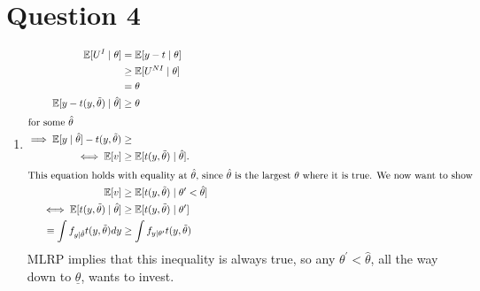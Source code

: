 \section{Question 4}
\begin{enumerate}[label=\alph*)]
\item
  \begin{align*}
    \mathbb{E}[U^I \mid \theta] &= \mathbb{E}[y - t \mid \theta]\\
    &\ge \mathbb{E}[U^{NI} \mid \theta ]\\
                        &= \theta \\
    \mathbb{E}[y - t(y, \tilde{\theta}) \mid \hat{\theta}] &\ge \theta\\
    \intertext{for some $\hat{\theta}$}
    \implies \mathbb{E}[y \mid \hat{\theta}] - t(y, \tilde{\theta}) &\ge \\
    \iff \mathbb{E}[v] &\ge \mathbb{E}[t(y, \tilde{\theta}) \mid \hat{\theta}].\\
    \intertext{This equation holds with equality at $\hat{\theta}$, since $\hat{\theta}$ is the largest $\theta$ where it is true. We now want to show}
    \mathbb{E}[v] &\ge \mathbb{E}[t(y, \tilde{\theta}) \mid \theta^\prime < \hat{\theta}]\\
    \iff \mathbb{E}[ t(y, \tilde{\theta}) \mid \hat{\theta}] &\ge \mathbb{E}[t(y, \tilde{\theta}) \mid \theta^\prime] \\
    \equiv \int f_{y \mid \hat{\theta}} t(y, \tilde{\theta})dy &\ge \int f_{y \mid \theta^\prime} t(y, \tilde{\theta})
  \end{align*}
  MLRP implies that this inequality is always true, so any $\theta^\prime < \hat{\theta}$, all the way down to $\underline{\theta}$, wants to invest.
\end{enumerate}
